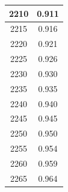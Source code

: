 \documentclass[a4paper]{article}
\begin{document}
\begin{tabular}{|c|c|}
		\hline
		2210 & 0.911 \\
		\hline
		2215 & 0.916 \\
		\hline
		2220 & 0.921 \\
		\hline
		2225 & 0.926 \\
		\hline
		2230 & 0.930 \\
		\hline
		2235 & 0.935 \\
		\hline
		2240 & 0.940 \\
		\hline
		2245 & 0.945 \\
		\hline
		2250 & 0.950 \\
		\hline
		2255 & 0.954 \\
		\hline
		2260 & 0.959 \\
		\hline
		2265 & 0.964 \\
		\hline
	\end{tabular}
	\hfill
\end{document}
